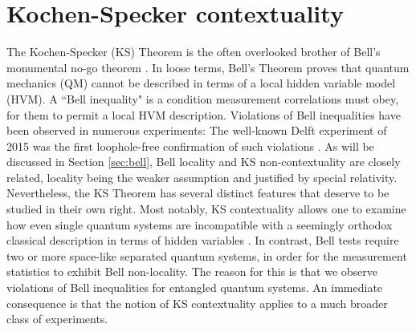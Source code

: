 \chapter{Kochen-Specker contextuality}
\label{sec:kscontextuality}
The Kochen-Specker (KS) Theorem \cite{Kochen1968} is the often overlooked brother of Bell's monumental no-go theorem \cite{Bell1964}. In loose terms, Bell's Theorem proves that quantum mechanics (QM) cannot be described in terms of a local hidden variable model (HVM). A ``Bell inequality" is a condition measurement correlations must obey, for them to permit a local HVM description. Violations of Bell inequalities have been observed in numerous experiments: The well-known Delft experiment of 2015 was the first loophole-free confirmation of such violations \cite{Hensen2015}. As will be discussed in Section \ref{sec:bell}, Bell locality and KS non-contextuality are closely related, locality being the weaker assumption and justified by special relativity. Nevertheless, the KS Theorem has several distinct features that deserve to be studied in their own right. Most notably, KS contextuality allows one to examine how even single quantum systems are incompatible with a seemingly orthodox classical description in terms of hidden variables \cite{Pusey2019}. In contrast, Bell tests require two or more space-like separated quantum systems, in order for the measurement statistics to exhibit Bell non-locality. The reason for this is that we observe violations of Bell inequalities for entangled quantum systems. An immediate consequence is that the notion of KS contextuality applies to a much broader class of experiments.

